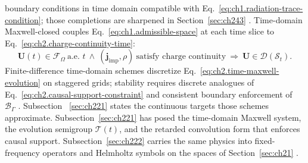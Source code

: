 boundary conditions in time domain compatible with
Eq.~\eqref{eq:ch1.radiation-trace-condition}; those completions are sharpened in
Section~\ref{sec:ch243} \cite{stratton1941}.
Time-domain Maxwell-closed couples Eq.~\eqref{eq:ch1.admissible-space} at each time
slice to Eq.~\eqref{eq:ch2.charge-continuity-time}:
\begin{equation}
\label{eq:ch2.time-charge-continuous-coupling}
\mathbf{U}(t)\in\mathcal{F}_\Omega\ \text{a.e.\ }t
\ \wedge\
(\mathbf{j}_{\mathrm{imp}},\rho)\ \text{satisfy charge continuity}
\ \Longrightarrow\
\mathbf{U}\in\mathcal{D}(\mathcal{S}_{t}).
\end{equation}
Finite-difference time-domain schemes discretize
Eq.~\eqref{eq:ch2.time-maxwell-evolution} on staggered grids; stability requires
discrete analogues of Eq.~\eqref{eq:ch2.causal-support-constraint} and consistent
boundary enforcement of \(\mathcal{B}_\Gamma\) \cite{harrington2001}. Subsection
~\ref{sec:ch221} states the continuous targets those schemes approximate.
Subsection~\ref{sec:ch221} has posed the time-domain Maxwell system, the evolution
semigroup \(\mathcal{T}(t)\), and the retarded convolution form that enforces causal
support. Subsection~\ref{sec:ch222} carries the same physics into fixed-frequency
operators and Helmholtz symbols on the spaces of Section~\ref{sec:ch21}
\cite{stratton1941}.
